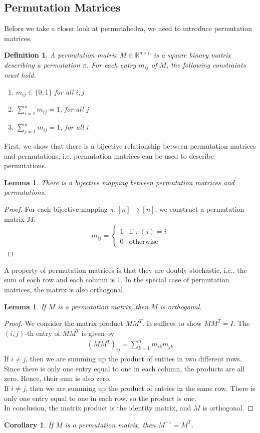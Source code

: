 \documentclass[12pt,letterpaper]{article}
\newcommand*{\R}{\mathbb{R}}
\newtheorem{definition}[theorem]{Definition}
\newtheorem{lemma}[theorem]{Lemma}
\newtheorem{corollary}[theorem]{Corollary}
\begin{document}
\subsection{Permutation Matrices}
Before we take a closer look at permutahedra, we need to introduce permutation matrices.
\begin{definition}
    A permutation matrix $M \in \R^{n \times n}$ is a square binary matrix describing a permutation $\pi$.
    For each entry $m_{ij}$ of $M$, the following constraints must hold.
    \begin{enumerate}
        \item $m_{ij} \in \{0, 1\}$ for all $i, j$
        \item $\sum_{i = 1}^n m_{ij} = 1$, for all $j$
        \item $\sum_{j = 1}^n m_{ij} = 1$, for all $i$
    \end{enumerate}
\end{definition}
First, we show that there is a bijective relationship between permutation matrices and permutations, i.e. permutation matrices 
can be used to describe permutations.
\begin{lemma}
    There is a bijective mapping between permutation matrices and permutations.
\end{lemma}
\begin{proof}
    For each bijective mapping $\pi: [n] \to [n]$, we construct a permutation matrix $M$.
    \begin{align*}
        m_{ij} = 
        \begin{cases}
            1 & \text{if } \pi(j) = i \\
            0 & \text{otherwise}
        \end{cases}
    \end{align*}
\end{proof}
A property of permutation matrices is that they are doubly stochastic, i.e., the sum of each row and each column is 1.
In the special case of permutation matrices, the matrix is also orthogonal.
\begin{lemma}
    If $M$ is a permutation matrix, then $M$ is orthogonal.
\end{lemma}
\begin{proof}
    We consider the matrix product $MM^T$. It suffices to show $MM^T = I$. The $(i, j)$-th entry of $MM^T$ is given by 
    \begin{align*}
        (MM^T)_{ij} = \sum_{k = 1}^n m_{ik}m_{jk}
    \end{align*}
    If $i \neq j$, then we are summing up the product of entries in two different rows. 
    Since there is only one entry equal to one in each column, the products are all zero. Hence, their sum is also zero. \\ 
    If $i \neq j$, then we are summing up the product of entries in the same row.
    There is only one entry equal to one in each row, so the product is one. \\
    In conclusion, the matrix product is the identity matrix, and $M$ is orthogonal.
\end{proof}
\begin{corollary}
    If $M$ is a permutation matrix, then $M^{-1} = M^T$.
\end{corollary}
\end{document}
